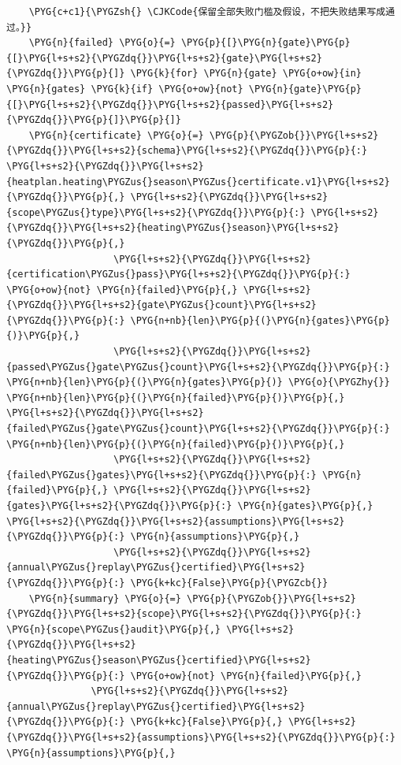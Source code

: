 \begin{Verbatim}
    \PYG{c+c1}{\PYGZsh{} \CJKCode{保留全部失败门槛及假设，不把失败结果写成通过。}}
    \PYG{n}{failed} \PYG{o}{=} \PYG{p}{[}\PYG{n}{gate}\PYG{p}{[}\PYG{l+s+s2}{\PYGZdq{}}\PYG{l+s+s2}{gate}\PYG{l+s+s2}{\PYGZdq{}}\PYG{p}{]} \PYG{k}{for} \PYG{n}{gate} \PYG{o+ow}{in} \PYG{n}{gates} \PYG{k}{if} \PYG{o+ow}{not} \PYG{n}{gate}\PYG{p}{[}\PYG{l+s+s2}{\PYGZdq{}}\PYG{l+s+s2}{passed}\PYG{l+s+s2}{\PYGZdq{}}\PYG{p}{]}\PYG{p}{]}
    \PYG{n}{certificate} \PYG{o}{=} \PYG{p}{\PYGZob{}}\PYG{l+s+s2}{\PYGZdq{}}\PYG{l+s+s2}{schema}\PYG{l+s+s2}{\PYGZdq{}}\PYG{p}{:} \PYG{l+s+s2}{\PYGZdq{}}\PYG{l+s+s2}{heatplan.heating\PYGZus{}season\PYGZus{}certificate.v1}\PYG{l+s+s2}{\PYGZdq{}}\PYG{p}{,} \PYG{l+s+s2}{\PYGZdq{}}\PYG{l+s+s2}{scope\PYGZus{}type}\PYG{l+s+s2}{\PYGZdq{}}\PYG{p}{:} \PYG{l+s+s2}{\PYGZdq{}}\PYG{l+s+s2}{heating\PYGZus{}season}\PYG{l+s+s2}{\PYGZdq{}}\PYG{p}{,}
                   \PYG{l+s+s2}{\PYGZdq{}}\PYG{l+s+s2}{certification\PYGZus{}pass}\PYG{l+s+s2}{\PYGZdq{}}\PYG{p}{:} \PYG{o+ow}{not} \PYG{n}{failed}\PYG{p}{,} \PYG{l+s+s2}{\PYGZdq{}}\PYG{l+s+s2}{gate\PYGZus{}count}\PYG{l+s+s2}{\PYGZdq{}}\PYG{p}{:} \PYG{n+nb}{len}\PYG{p}{(}\PYG{n}{gates}\PYG{p}{)}\PYG{p}{,}
                   \PYG{l+s+s2}{\PYGZdq{}}\PYG{l+s+s2}{passed\PYGZus{}gate\PYGZus{}count}\PYG{l+s+s2}{\PYGZdq{}}\PYG{p}{:} \PYG{n+nb}{len}\PYG{p}{(}\PYG{n}{gates}\PYG{p}{)} \PYG{o}{\PYGZhy{}} \PYG{n+nb}{len}\PYG{p}{(}\PYG{n}{failed}\PYG{p}{)}\PYG{p}{,} \PYG{l+s+s2}{\PYGZdq{}}\PYG{l+s+s2}{failed\PYGZus{}gate\PYGZus{}count}\PYG{l+s+s2}{\PYGZdq{}}\PYG{p}{:} \PYG{n+nb}{len}\PYG{p}{(}\PYG{n}{failed}\PYG{p}{)}\PYG{p}{,}
                   \PYG{l+s+s2}{\PYGZdq{}}\PYG{l+s+s2}{failed\PYGZus{}gates}\PYG{l+s+s2}{\PYGZdq{}}\PYG{p}{:} \PYG{n}{failed}\PYG{p}{,} \PYG{l+s+s2}{\PYGZdq{}}\PYG{l+s+s2}{gates}\PYG{l+s+s2}{\PYGZdq{}}\PYG{p}{:} \PYG{n}{gates}\PYG{p}{,} \PYG{l+s+s2}{\PYGZdq{}}\PYG{l+s+s2}{assumptions}\PYG{l+s+s2}{\PYGZdq{}}\PYG{p}{:} \PYG{n}{assumptions}\PYG{p}{,}
                   \PYG{l+s+s2}{\PYGZdq{}}\PYG{l+s+s2}{annual\PYGZus{}replay\PYGZus{}certified}\PYG{l+s+s2}{\PYGZdq{}}\PYG{p}{:} \PYG{k+kc}{False}\PYG{p}{\PYGZcb{}}
    \PYG{n}{summary} \PYG{o}{=} \PYG{p}{\PYGZob{}}\PYG{l+s+s2}{\PYGZdq{}}\PYG{l+s+s2}{scope}\PYG{l+s+s2}{\PYGZdq{}}\PYG{p}{:} \PYG{n}{scope\PYGZus{}audit}\PYG{p}{,} \PYG{l+s+s2}{\PYGZdq{}}\PYG{l+s+s2}{heating\PYGZus{}season\PYGZus{}certified}\PYG{l+s+s2}{\PYGZdq{}}\PYG{p}{:} \PYG{o+ow}{not} \PYG{n}{failed}\PYG{p}{,}
               \PYG{l+s+s2}{\PYGZdq{}}\PYG{l+s+s2}{annual\PYGZus{}replay\PYGZus{}certified}\PYG{l+s+s2}{\PYGZdq{}}\PYG{p}{:} \PYG{k+kc}{False}\PYG{p}{,} \PYG{l+s+s2}{\PYGZdq{}}\PYG{l+s+s2}{assumptions}\PYG{l+s+s2}{\PYGZdq{}}\PYG{p}{:} \PYG{n}{assumptions}\PYG{p}{,}

\end{Verbatim}
